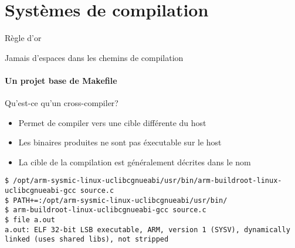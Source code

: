 %
%
%

\part{Systèmes de compilation}

\begin{frame}
  \partpage
\end{frame}

\begin{frame}
  \tableofcontents
\end{frame}



\begin{frame}[fragile=singleslide]{Règle d'or}
  \begin{center}
    \huge{Jamais d'espaces dans les chemins de compilation}
  \end{center}
\end{frame}

\subsection{Un projet base de Makefile}

\begin{frame}[fragile=singleslide]{Qu'est-ce qu'un cross-compiler?}
  \begin{itemize}
  \item Permet de compiler vers une cible différente du host
  \item Les binaires produites ne sont pas éxecutable sur le host
  \item La cible de la compilation est généralement décrites dans le nom
  \end{itemize}
  \begin{lstlisting}
$ /opt/arm-sysmic-linux-uclibcgnueabi/usr/bin/arm-buildroot-linux-uclibcgnueabi-gcc source.c
$ PATH+=:/opt/arm-sysmic-linux-uclibcgnueabi/usr/bin/
$ arm-buildroot-linux-uclibcgnueabi-gcc source.c
$ file a.out
a.out: ELF 32-bit LSB executable, ARM, version 1 (SYSV), dynamically linked (uses shared libs), not stripped
  \end{lstlisting}
\end{frame}

